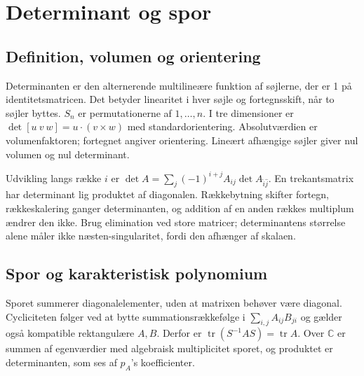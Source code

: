 \section{Determinant og spor}
\subsection{Definition, volumen og orientering}
Determinanten er den alternerende multilineære funktion af søjlerne,
der er 1 på identitetsmatricen. Det betyder linearitet i hver søjle og
fortegnsskift, når to søjler byttes.
$S_n$ er permutationerne af $1,\ldots,n$. I tre dimensioner er
$\det[u\ v\ w]=u\cdot(v\times w)$ med standardorientering.
Absolutværdien er volumenfaktoren; fortegnet angiver orientering.
Lineært afhængige søjler giver nul volumen og nul determinant.



Udvikling langs række $i$ er
$\det A=\sum_j(-1)^{i+j}A_{ij}\det A_{\hat i\hat j}$.
En trekantsmatrix har determinant lig produktet af diagonalen.
Rækkebytning skifter fortegn, rækkeskalering ganger determinanten,
og addition af en anden rækkes multiplum ændrer den ikke.
Brug elimination ved store matricer; determinantens størrelse alene
måler ikke næsten-singularitet, fordi den afhænger af skalaen.

\subsection{Spor og karakteristisk polynomium}
\label{sec:spor-kontraktion}
Sporet summerer diagonalelementer, uden at matrixen behøver være diagonal.
Cycliciteten følger ved at bytte summationsrækkefølge i
$\sum_{i,j}A_{ij}B_{ji}$ og gælder også kompatible rektangulære $A,B$.
Derfor er $\operatorname{tr}(S^{-1}AS)=\operatorname{tr}A$.
Over $\mathbb C$ er summen af egenværdier med algebraisk multiplicitet
sporet, og produktet er determinanten, som ses af $p_A$'s koefficienter.


